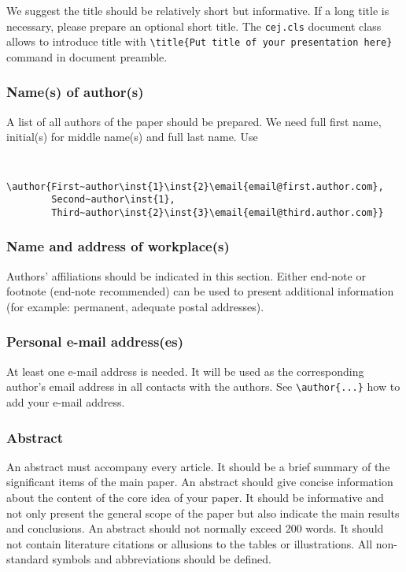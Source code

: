 \documentclass[CEJCS,PDF]{cej} %
\begin{document}
We suggest the title should be relatively short but informative. If a long title is necessary, please prepare an optional short title. The {\tt cej.cls} document class allows to introduce title with {\tt \verb+\title{Put title of your presentation here}+}
command in document preamble.

\subsubsection{Name(s) of author(s)}

A list of all authors of the paper should be prepared. We need full first name, initial(s) for middle name(s) and full last name. Use
{\tt 
\begin{verbatim}
\author{First~author\inst{1}\inst{2}\email{email@first.author.com},
        Second~author\inst{1},
        Third~author\inst{2}\inst{3}\email{email@third.author.com}}
\end{verbatim} 
}

\subsubsection{Name and address of workplace(s)}

Authors' affiliations should be indicated in this section. Either end-note or footnote (end-note recommended) can be used to present additional information (for example: permanent, adequate postal addresses).

\subsubsection{Personal e-mail address(es)}

At least one e-mail address is needed. It will be used as the corresponding author's email address in all contacts with the authors. See  {\tt \verb+\author{...}+} how to add your e-mail address.

\subsubsection{Abstract}

An abstract must accompany every article. It should be a brief summary of the significant items of the main paper. An abstract should give concise information about the content of the core idea of your paper. It should be informative and not only present the general scope of the paper but also indicate the main results and conclusions. An abstract should not normally exceed 200 words. It should not contain literature citations or allusions to the tables or illustrations. All non-standard symbols and abbreviations should be defined.
\end{document}
